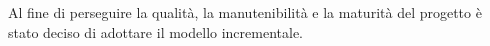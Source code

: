 Al fine di perseguire la qualità, la {manutenibilità} e la maturità del progetto
è stato deciso di adottare il {modello incrementale}.